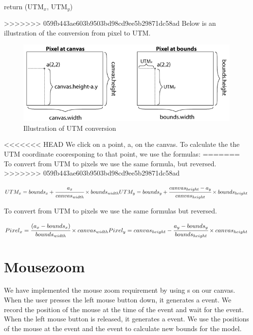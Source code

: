 return (UTM$_x$, UTM$_y$)


>>>>>>> 059fb443ae603b9503bd98cd9ee5b29871dc58ad
Below is an illustration of the conversion from pixel to UTM.

\begin{figure}[!ht]
\centering
\includegraphics[width=1\linewidth]{images/UTMillu}
\caption{Illustration of UTM conversion}
\label{fig:UTMconversion}
\end{figure}

<<<<<<< HEAD
We click on a point, a, on the canvas. To calculate the the UTM coordinate
cooresponing to that point, we use the formulas:
=======
To convert from UTM to pixels we use the same formula, but reversed.
>>>>>>> 059fb443ae603b9503bd98cd9ee5b29871dc58ad

$
UTM_x = bounds_x + \cfrac{a_x}{canvas_{width}} \times bounds_{width}\\
\\
UTM_y = bounds_y + \cfrac{canvas_{height} - a_y}{canvas_{height}} \times bounds_{height}\\
\\
$

To convert from UTM to pixels we use the same formulas but reversed.

$
\\
Pixel_x = \cfrac{(a_x - bounds_x)}{bounds_{width}} \times
canvas_{width}\\
\\
Pixel_y = canvas_{height} - \cfrac{a_y - bounds_y}{bounds_{height}} \times
canvas_{height}\\
\\
$

\section{Mousezoom}
\label{IMPL-MZ}
We have implemented the mouse zoom requirement by using s on
our canvas. When the user presses the left mouse button down, it generates a
 event. We record the position of the mouse at the time of
the  event and wait for the  event.
When the left mouse button is released, it generates a 
event. We use the positions of the mouse at the  event and
the  event to calculate new bounds for the model.

